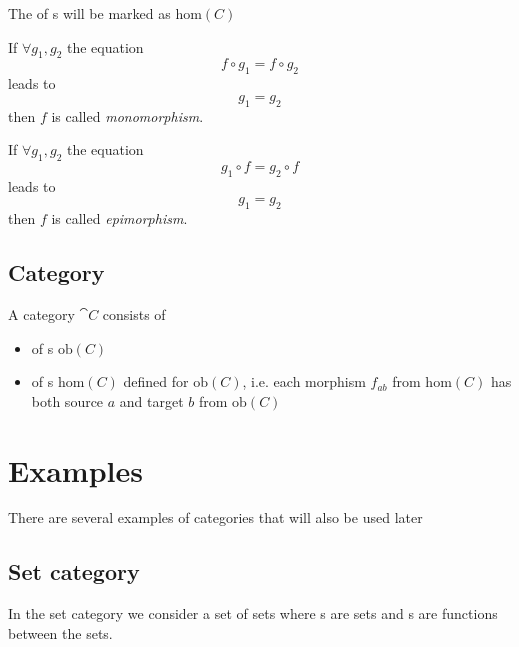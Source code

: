 \begin{remark}
\label{rem:morphclass}
The  of s will be marked as 
$\mathrm{hom}(C)$
\end{remark}

\begin{definition}[Monomorphism]
\label{def:monomorphism}
If $\forall g_1, g_2$ the equation 
\[
f \circ g_1 = f \circ g_2
\]
leads to 
\[
g_1 = g_2
\]
then $f$ is called \textit{monomorphism}.
\end{definition}

\begin{definition}[Epimorphism]
\label{def:epimorphism}
If $\forall g_1, g_2$ the equation 
\[
g_1 \circ f = g_2 \circ f
\]
leads to 
\[
g_1 = g_2
\]
then $f$ is called \textit{epimorphism}.
\end{definition}


\subsection{Category}

\begin{definition}[Category]
\label{def:category}
A category $\cat{C}$ consists of 
\begin{itemize}
\item {} of
s $\mathrm{ob}(C)$
\item {} of s $\mathrm{hom}(C)$
defined for $\mathrm{ob}(C)$, i.e. each morphism $f_{ab}$ from 
$\mathrm{hom}(C)$ has both source
$a$ and target $b$ from $\mathrm{ob}(C)$
\end{itemize}
\end{definition}

\section{Examples}

There are several examples of categories that will also be used later

\subsection{\textbf{Set} category}
\begin{example}
\label{ex:setcategory}
In the set category we consider a set of sets where
s are sets and s are
functions between the sets. 
\end{example}

